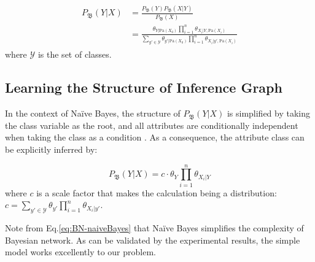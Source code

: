 \vspace{-1ex}
\begin{align}\label{eq:BNWithCls}
\begin{split}
P_\mathfrak{B}(Y|{X}) & = 
\frac{ P_\mathfrak{B}(Y) P_\mathfrak{B}({X}|Y) }{P_\mathfrak{B}({X})}\\
&=\frac{ \theta_{Y|\text{Pa}({X}_0)} \prod_{i=1}^{n} \theta_{X_i|Y, \text{Pa}({X}_i)} }{ \sum_{y'\in \mathcal{Y}} \theta_{y'|\text{Pa}({X}_0)} \prod_{i=1}^{n} \theta_{X_i|y', \text{Pa}({X}_i)} }
\end{split}
\end{align}
where $\mathcal{Y}$ is the set of classes.


\subsection{Learning the Structure of Inference Graph}

In the context of Na\"{i}ve Bayes, 
the structure of $P_\mathfrak{B}(Y|{X})$ is simplified by taking the class variable as the root, and all attributes are conditionally independent when taking the class as a condition \cite{petitjean2018accurate}. As a consequence, the attribute class can be explicitly inferred by:

\begin{equation}\label{eq:BN-naiveBayes}
P_\mathfrak{B}(Y| {X}) = c \cdot \theta_Y \prod_{i=1}^{n}\theta_{X_i|Y}
\end{equation}
where $c$ is a scale factor that makes the calculation being a distribution: $c=\sum_{y'\in \mathcal{Y}}  \theta_{y'} \prod_{i=1}^{n}\theta_{X_i|y'}$.

Note from Eq.\eqref{eq:BN-naiveBayes} that Na\"{i}ve Bayes simplifies the complexity of Bayesian network. As can be validated by the experimental results, the simple model works excellently to our problem. 

